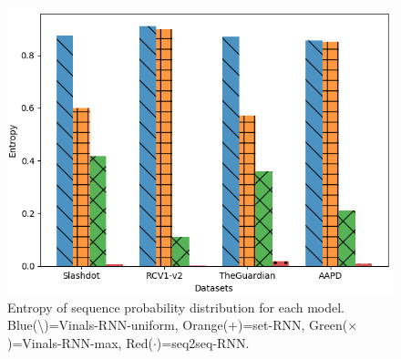 \begin{figure}[t]
\includegraphics[width=1.00\columnwidth]{figs/entropy.png}

\caption{Entropy of sequence probability distribution for each model. Blue(\textbackslash)=Vinals-RNN-uniform, Orange(+)=set-RNN, Green($\times$)=Vinals-RNN-max, Red($\cdot$)=seq2seq-RNN.}
\label{fig:entropy}
\end{figure}






